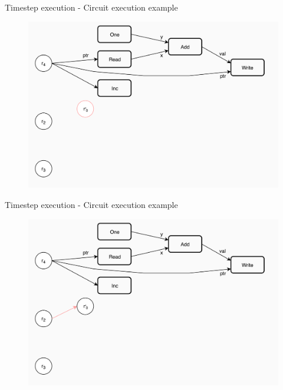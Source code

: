 \documentclass[xcolor={usenames}]{beamer}
\begin{document}
  \begin{frame}{Timestep execution - Circuit execution example}
  	\begin{figure}
  		\centering
  		\includegraphics[width=\textwidth]{../figures/example-circuit-12.png}
  	\end{figure}
  \end{frame}
  \begin{frame}{Timestep execution - Circuit execution example}
  	\begin{figure}
  		\centering
  		\includegraphics[width=\textwidth]{../figures/example-circuit-13.png}
  	\end{figure}
  \end{frame}
\end{document}
